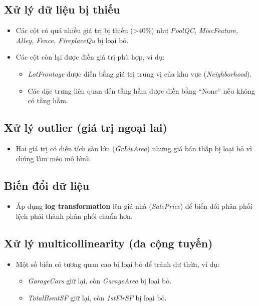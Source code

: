 \subsection{Xử lý dữ liệu bị thiếu}
\begin{itemize}
    \item Các cột có quá nhiều giá trị bị thiếu (>40\%) như \textit{PoolQC, MiscFeature, Alley, Fence, FireplaceQu} bị loại bỏ.
    \item Các cột còn lại được điền giá trị phù hợp, ví dụ:
    \begin{itemize}
        \item \textit{LotFrontage} được điền bằng giá trị trung vị của khu vực (\textit{Neighborhood}).
        \item Các đặc trưng liên quan đến tầng hầm được điền bằng ``None'' nếu không có tầng hầm.
    \end{itemize}
\end{itemize}

\subsection{Xử lý outlier (giá trị ngoại lai)}
\begin{itemize}
    \item Hai giá trị có diện tích sàn lớn (\textit{GrLivArea}) nhưng giá bán thấp bị loại bỏ vì chúng làm méo mô hình.
\end{itemize}

\subsection{Biến đổi dữ liệu}
\begin{itemize}
    \item Áp dụng \textbf{log transformation} lên giá nhà (\textit{SalePrice}) để biến đổi phân phối lệch phải thành phân phối chuẩn hơn.
\end{itemize}

\subsection{Xử lý multicollinearity (đa cộng tuyến)}
\begin{itemize}
    \item Một số biến có tương quan cao bị loại bỏ để tránh dư thừa, ví dụ:
    \begin{itemize}
        \item \textit{GarageCars} giữ lại, còn \textit{GarageArea} bị loại bỏ.
        \item \textit{TotalBsmtSF} giữ lại, còn \textit{1stFlrSF} bị loại bỏ.
    \end{itemize}
\end{itemize}

